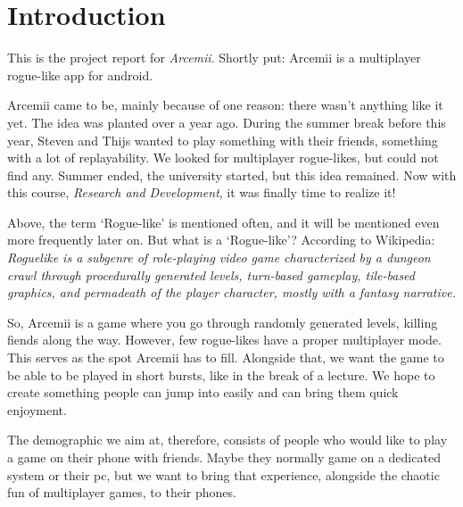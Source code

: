\documentclass[../main.tex]{subfiles}
\begin{document}
\pagebreak
\section{Introduction}
This is the project report for \textit{Arcemii}. Shortly put: Arcemii is a multiplayer rogue-like app for android.

Arcemii came to be, mainly because of one reason: there wasn't anything like it yet. The idea was planted over a year ago. During the summer break before this year, Steven and Thijs wanted to play something with their friends, something with a lot of replayability. We looked for multiplayer rogue-likes, but could not find any. Summer ended, the university started, but this idea remained. Now with this course, \textit{Research and Development}, it was finally time to realize it!

\bigbreak\noindent
Above, the term `Rogue-like' is mentioned often, and it will be mentioned even more frequently later on. But what is a `Rogue-like'?  According to Wikipedia: \textit{Roguelike is a subgenre of role-playing video game characterized by a dungeon crawl through procedurally generated levels, turn-based gameplay, tile-based graphics, and permadeath of the player character, mostly with a fantasy narrative.}

So, Arcemii is a game where you go through randomly generated levels, killing fiends along the way. However, few rogue-likes have a proper multiplayer mode. This serves as the spot Arcemii has to fill. Alongside that, we want the game to be able to be played in short bursts, like in the break of a lecture. We hope to create something people can jump into easily and can bring them quick enjoyment. 

The demographic we aim at, therefore, consists of people who would like to play a game on their phone with friends. Maybe they normally game on a dedicated system or their pc, but we want to bring that experience, alongside the chaotic fun of multiplayer games, to their phones.
\end{document}
